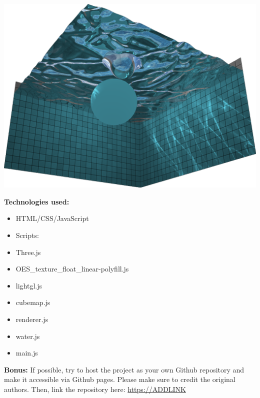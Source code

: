 \documentclass[10pt,oneside,onecolumn,letterpaper]{article}
\begin{document}
\vspace{.5cm}
\noindent\includegraphics[width=\textwidth]{gfx/screenshot-madebyevan_webgl_water.png}

\vspace{1.0cm}

\noindent\textbf{Technologies used:}

\begin{itemize}
    \item HTML/CSS/JavaScript
    \item Scripts:
    \item Three.js
    \item OES\_texture\_float\_linear-polyfill.js
    \item lightgl.js
    \item cubemap.js
    \item renderer.js
    \item water.js
    \item main.js
\end{itemize}

\noindent\textbf{Bonus:} If possible, try to host the project as your own Github repository and make it accessible via Github pages. Please make sure to credit the original authors. Then, link the repository here: \url{https://ADDLINK}
\end{document}
